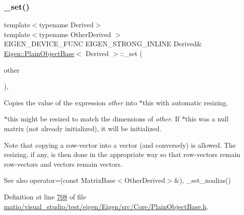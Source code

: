 \subsubsection{\texorpdfstring{\+\_\+set()}{\_set()}\hspace{0.1cm}{\footnotesize\ttfamily [2/2]}}
{\footnotesize\ttfamily template$<$typename Derived$>$ \\
template$<$typename Other\+Derived $>$ \\
E\+I\+G\+E\+N\+\_\+\+D\+E\+V\+I\+C\+E\+\_\+\+F\+U\+NC E\+I\+G\+E\+N\+\_\+\+S\+T\+R\+O\+N\+G\+\_\+\+I\+N\+L\+I\+NE Derived\& \hyperlink{class_eigen_1_1_plain_object_base}{Eigen\+::\+Plain\+Object\+Base}$<$ Derived $>$\+::\+\_\+set (\begin{DoxyParamCaption}\item[{const \hyperlink{group___core___module_class_eigen_1_1_dense_base}{Dense\+Base}$<$ Other\+Derived $>$ \&}]{other }\end{DoxyParamCaption})\hspace{0.3cm}{\ttfamily [inline]}, {\ttfamily [protected]}}



Copies the value of the expression {\itshape other} into {\ttfamily $\ast$this} with automatic resizing. 

$\ast$this might be resized to match the dimensions of {\itshape other}. If $\ast$this was a null matrix (not already initialized), it will be initialized.

Note that copying a row-\/vector into a vector (and conversely) is allowed. The resizing, if any, is then done in the appropriate way so that row-\/vectors remain row-\/vectors and vectors remain vectors.

\begin{DoxySeeAlso}{See also}
operator=(const Matrix\+Base$<$\+Other\+Derived$>$\&), \+\_\+set\+\_\+noalias() 
\end{DoxySeeAlso}


Definition at line \hyperlink{matio_2visual__studio_2test_2eigen_2_eigen_2src_2_core_2_plain_object_base_8h_source_l00708}{708} of file \hyperlink{matio_2visual__studio_2test_2eigen_2_eigen_2src_2_core_2_plain_object_base_8h_source}{matio/visual\+\_\+studio/test/eigen/\+Eigen/src/\+Core/\+Plain\+Object\+Base.\+h}.

\mbox{\label{class_eigen_1_1_plain_object_base_afbfc12954f16d21aedb7bd839f64a278}} 
